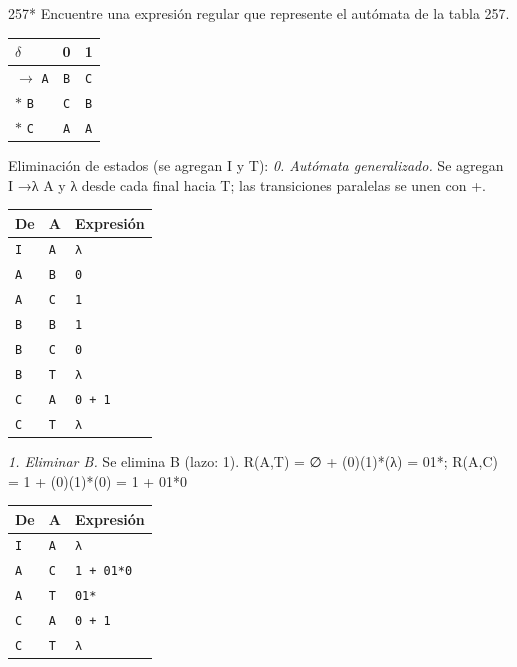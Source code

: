 \documentclass[11pt]{article}
\begin{document}
\begin{ejercicio}{257}{*}
Encuentre una expresión regular que represente el autómata de la tabla 257.
\end{ejercicio}
\proc \begin{center}\small\begin{tabular}{lcc}\toprule
$\delta$ & 0 & 1 \\\midrule
$\to$ \texttt{A} & \texttt{B} & \texttt{C} \\
$*$ \texttt{B} & \texttt{C} & \texttt{B} \\
$*$ \texttt{C} & \texttt{A} & \texttt{A} \\
\bottomrule\end{tabular}\end{center}
Eliminación de estados (se agregan I y T):
\textit{0. Autómata generalizado.} Se agregan I →λ A y λ desde cada final hacia T; las transiciones paralelas se unen con +.
\begin{center}\footnotesize\begin{tabular}{lll}\toprule
De & A & Expresión \\\midrule
\texttt{I} & \texttt{A} & \texttt{λ} \\
\texttt{A} & \texttt{B} & \texttt{0} \\
\texttt{A} & \texttt{C} & \texttt{1} \\
\texttt{B} & \texttt{B} & \texttt{1} \\
\texttt{B} & \texttt{C} & \texttt{0} \\
\texttt{B} & \texttt{T} & \texttt{λ} \\
\texttt{C} & \texttt{A} & \texttt{0 + 1} \\
\texttt{C} & \texttt{T} & \texttt{λ} \\
\bottomrule\end{tabular}\end{center}
\textit{1. Eliminar B.} Se elimina B (lazo: 1). R(A,T) = ∅ + (0)(1)*(λ) = 01*; R(A,C) = 1 + (0)(1)*(0) = 1 + 01*0
\begin{center}\footnotesize\begin{tabular}{lll}\toprule
De & A & Expresión \\\midrule
\texttt{I} & \texttt{A} & \texttt{λ} \\
\texttt{A} & \texttt{C} & \texttt{1 + 01*0} \\
\texttt{A} & \texttt{T} & \texttt{01*} \\
\texttt{C} & \texttt{A} & \texttt{0 + 1} \\
\texttt{C} & \texttt{T} & \texttt{λ} \\
\bottomrule\end{tabular}\end{center}
\end{document}
